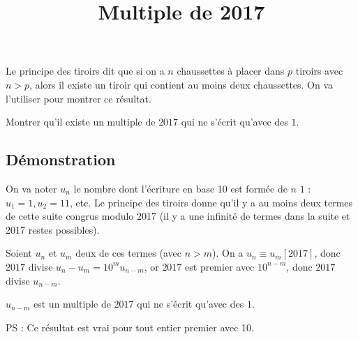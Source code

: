 \documentclass[fontsize=12pt,twoside=false,parskip=half]{scrartcl}
\title{Multiple de 2017}
\date{}
\author{}
\begin{document}
\maketitle
   Le principe des tiroirs dit que si on a $n$ chaussettes à placer dans $p$ tiroirs avec $n > p$, 
   alors il existe un tiroir qui contient au moins deux chaussettes. On va l’utiliser pour montrer ce résultat.
   \begin{Theoreme}
      Montrer qu’il existe un multiple de $2017$ qui ne s’écrit qu’avec des $1$.
   \end{Theoreme}
   \subsection{Démonstration}
      On va noter $u_n$ le nombre dont l’écriture en base 10 est formée de $n$ $1$ : $u_1 = 1,u_2 = 11$, etc.
      Le principe des tiroirs donne qu’il y a au moins deux termes de cette suite congrus modulo 2017 (il y a une 
      infinité de termes dans la suite et 2017 restes possibles).
      
      Soient $u_n$ et $u_m$ deux de ces termes (avec $n > m$). 
      On a $u_n \equiv u_m[2017]$, donc $2017$ divise $u_n - u_m = 10^mu_{n - m}$, or $2017$ est premier avec 
      $10^{n - m}$, donc $2017$ divise $u_{n - m}$.
      
      $u_{n - m}$ est un multiple de $2017$ qui ne s’écrit qu’avec des $1$.
      
      PS : Ce résultat est vrai pour tout entier premier avec 10.
\end{document}
